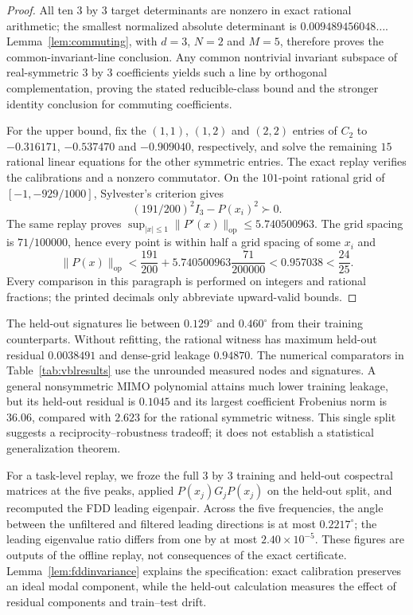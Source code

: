 \documentclass[11pt]{article}
\theoremstyle{remark}
\newcommand{\op}{\mathrm{op}}
\begin{document}
\begin{proof}
All ten $3$ by $3$ target determinants are nonzero in exact rational
arithmetic; the smallest normalized absolute determinant is
$0.009489456048\ldots$.  Lemma~\ref{lem:commuting}, with $d=3$, $N=2$ and
$M=5$, therefore proves the common-invariant-line conclusion.  Any common
nontrivial invariant subspace of real-symmetric $3$ by $3$ coefficients yields
such a line by orthogonal complementation, proving the stated reducible-class
bound and the stronger identity conclusion for commuting coefficients.

For the upper bound, fix the $(1,1)$, $(1,2)$ and $(2,2)$ entries of $C_2$ to
$-0.316171$, $-0.537470$ and $-0.909040$, respectively, and solve the remaining
$15$ rational linear equations for the other symmetric entries.  The exact
replay verifies the calibrations and a nonzero commutator.  On the $101$-point
rational grid of $[-1,-929/1000]$, Sylvester's criterion gives
\[
  (191/200)^2I_3-P(x_i)^2\succ0.
\]
The same replay proves
$\sup_{|x|\le1}\|P'(x)\|_{\op}\le5.740500963$.  The grid spacing is
$71/100000$, hence every point is within half a grid spacing of some $x_i$ and
\[
 \|P(x)\|_{\op}
 <\frac{191}{200}
   +5.740500963\frac{71}{200000}
 <0.957038<\frac{24}{25}.
\]
Every comparison in this paragraph is performed on integers and rational
fractions; the printed decimals only abbreviate upward-valid bounds.
\end{proof}

The held-out signatures lie between $0.129^\circ$ and $0.460^\circ$ from their
training counterparts.  Without refitting, the rational witness has maximum
held-out residual $0.0038491$ and dense-grid leakage $0.94870$.  The numerical
comparators in Table~\ref{tab:vblresults} use the unrounded measured nodes and
signatures.  A general nonsymmetric MIMO polynomial attains much lower training
leakage, but its held-out residual is $0.1045$ and its largest coefficient
Frobenius norm is $36.06$, compared with $2.623$ for the rational symmetric
witness.  This single split suggests a reciprocity--robustness tradeoff; it
does not establish a statistical generalization theorem.

For a task-level replay, we froze the full $3$ by $3$ training and held-out
cospectral matrices at the five peaks, applied $P(x_j)G_jP(x_j)$ on the
held-out split, and recomputed the FDD leading eigenpair.  Across the five
frequencies, the angle between the unfiltered and filtered leading directions
is at most $0.2217^\circ$; the leading eigenvalue ratio differs from one by at
most $2.40\times10^{-5}$.  These figures are outputs of the offline replay,
not consequences of the exact certificate.  Lemma~\ref{lem:fddinvariance}
explains the specification: exact calibration preserves an ideal modal
component, while the held-out calculation measures the effect of residual
components and train--test drift.
\end{document}
